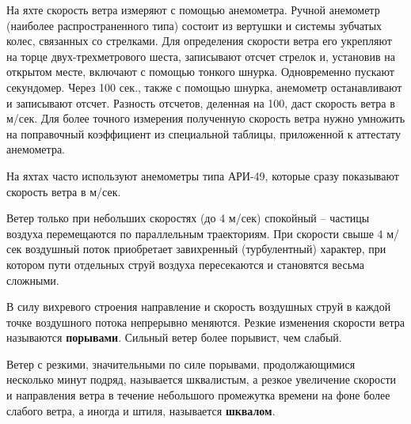 \documentclass[a4paper, 12pt, twoside, final]{scrbook}
\begin{document}
На яхте скорость ветра измеряют с помощью анемометра. Ручной анемометр (наиболее распространенного типа) состоит из вертушки и системы зубчатых колес, связанных со стрелками. Для определения скорости ветра его укрепляют на торце двух-трехметрового шеста, записывают отсчет стрелок и, установив на открытом месте, включают с помощью тонкого шнурка. Одновременно пускают секундомер. Через 100 сек., также с помощью шнурка, анемометр останавливают и записывают отсчет. Разность отсчетов, деленная на 100, даст скорость ветра в м/сек. Для более точного измерения полученную скорость ветра нужно умножить на поправочный коэффициент из специальной таблицы, приложенной к аттестату анемометра.

На яхтах часто используют анемометры типа АРИ-49, которые сразу показывают скорость ветра в м/сек.

Ветер только при небольших скоростях (до 4 м/сек) спокойный \--- частицы воздуха перемещаются по параллельным траекториям. При скорости свыше 4 м/сек воздушный поток приобретает завихренный (турбулентный) характер, при котором пути отдельных струй воздуха пересекаются и становятся весьма сложными.

В силу вихревого строения направление и скорость воздушных струй в каждой точке воздушного потока непрерывно меняются. Резкие изменения скорости ветра называются \textbf{порывами}. Сильный ветер более порывист, чем слабый.

Ветер с резкими, значительными по силе порывами, продолжающимися несколько минут подряд, называется шквалистым, а резкое увеличение скорости и направления ветра в течение небольшого промежутка времени на фоне более слабого ветра, а иногда и штиля, называется \textbf{шквалом}.
\end{document}
